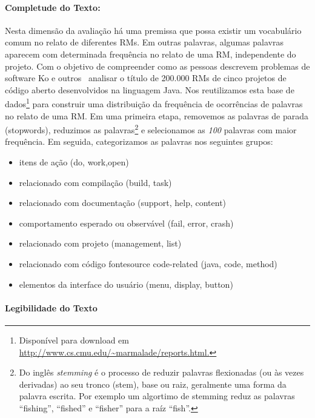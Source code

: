 \paragraph{Completude do Texto:}
\label{par:completude_de_palavras_chaves}

Nesta dimensão da avaliação há uma premissa que possa existir um vocabulário
comum no relato de diferentes RMs. Em outras palavras, algumas palavras aparecem
com determinada frequência no relato de uma RM, independente do projeto. Com o
objetivo de compreender como as pessoas descrevem problemas de software Ko e
outros~\cite{ko2006linguistic} analisar o título de 200.000 RMs de cinco
projetos de código aberto desenvolvidos na linguagem Java. Nos reutilizamos esta
base de dados\footnote{Disponível para download em
    \url{http://www.cs.cmu.edu/~marmalade/reports.html.}} para construir uma
distribuição da frequência de ocorrências de palavras no relato de uma RM\@.  Em
uma primeira etapa, removemos as palavras de parada (stopwords), reduzimos as
palavras\footnote{Do inglês \textit{stemming} é o processo de reduzir palavras
    flexionadas (ou às vezes derivadas) ao seu tronco (stem), base ou raiz,
    geralmente uma forma da palavra escrita. Por exemplo um algortimo de
    stemming reduz as palavras ``fishing'', ``fished'' e ``fisher'' para a raíz
    ``fish''.} e selecionamos as \textit{100} palavras com maior frequência. Em
seguida, categorizamos as palavras nos seguintes grupos:

\begin{itemize}

    \item itens de ação (do, work,open)
    \item relacionado com compilação (build, task)
    \item relacionado com documentação (support, help, content)
    \item comportamento esperado ou observável (fail, error, crash)
    \item relacionado com projeto (management, list)
    \item relacionado com código fontesource code-related (java, code, method)
    \item elementos da interface do usuário (menu, display, button)

\end{itemize}

\paragraph{Legibilidade do Texto}
\label{par:legibilidade_do_texto}

